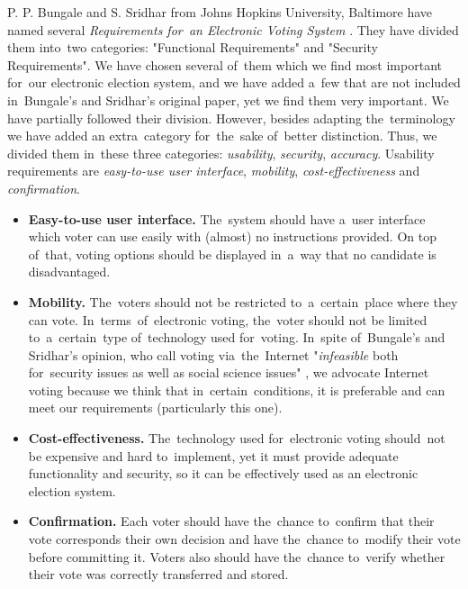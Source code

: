 P. P. Bungale and S. Sridhar from Johns Hopkins University, Baltimore have named several \emph{Requirements for~an Electronic Voting System} \cite{BunSri}. They have divided them into~two categories: "Functional Requirements" and "Security Requirements". We have chosen several of~them which we find most important for~our electronic election system, and we have added a~few that are not included in~Bungale's and Sridhar's original paper, yet we find them very important. We have partially followed their division. However, besides adapting the~terminology we have added an extra~category for~the~sake of~better distinction.  Thus, we divided them in~these three categories: \emph{usability}, \emph{security}, \emph{accuracy}. 
\bigbreak
Usability requirements are \emph{easy-to-use user interface}, \emph{mobility}, \emph{cost-effectiveness} and \emph{confirmation}.
\begin{itemize}
\item \textbf{Easy-to-use user interface.} The~system should have a~user interface which voter can use easily with (almost) no instructions provided. On top of~that, voting options should be displayed in~a~way that no candidate is disadvantaged.
\item \textbf{Mobility.} The~voters should not be restricted to~a~certain~place where they can vote. In~terms~of~electronic voting, the~voter should not be limited to~a~certain~type of~technology used for~voting. In~spite of~Bungale's and Sridhar's opinion, who call voting via~the~Internet "\emph{infeasible} both for~security issues as well as social science issues" \cite{BunSri}, we advocate Internet voting because we think that in~certain~conditions, it is preferable and can meet our requirements (particularly this one).
\item \textbf{Cost-effectiveness.} The~technology used for~electronic voting should~not be expensive and hard to~implement, yet it must provide adequate functionality and security, so it can be effectively used as an electronic election system.
\item \textbf{Confirmation.} Each voter should have the~chance to~confirm that their vote corresponds their own decision and have the~chance to~modify their vote before committing it. Voters also should have the~chance to~verify whether their vote was correctly transferred and stored.
\end{itemize}

